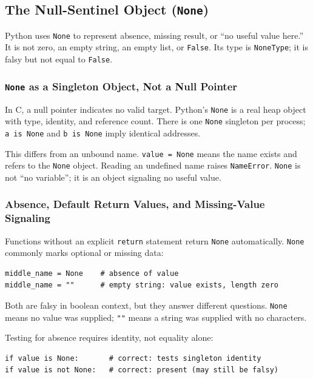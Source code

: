 \subsection{The Null-Sentinel Object (\texttt{None})}

Python uses \texttt{None} to represent absence, missing result, or ``no useful value here.'' It is not zero, an empty string, an empty list, or \texttt{False}. Its type is \texttt{NoneType}; it is falsy but not equal to \texttt{False}.

\subsubsection{\texttt{None} as a Singleton Object, Not a Null Pointer}

In C, a null pointer indicates no valid target. Python's \texttt{None} is a real heap object with type, identity, and reference count. There is one \texttt{None} singleton per process; \texttt{a is None} and \texttt{b is None} imply identical addresses.

This differs from an unbound name. \texttt{value = None} means the name exists and refers to the \texttt{None} object. Reading an undefined name raises \texttt{NameError}. \texttt{None} is not ``no variable''; it is an object signaling no useful value.

\subsubsection{Absence, Default Return Values, and Missing-Value Signaling}

Functions without an explicit \texttt{return} statement return \texttt{None} automatically. \texttt{None} commonly marks optional or missing data:

\begin{verbatim}
middle_name = None    # absence of value
middle_name = ""      # empty string: value exists, length zero
\end{verbatim}

Both are falsy in boolean context, but they answer different questions. \texttt{None} means no value was supplied; \texttt{""} means a string was supplied with no characters.

Testing for absence requires identity, not equality alone:

\begin{verbatim}
if value is None:       # correct: tests singleton identity
if value is not None:   # correct: present (may still be falsy)
\end{verbatim}

